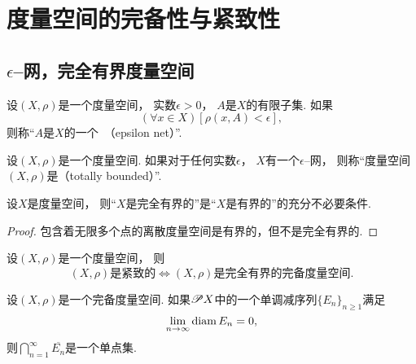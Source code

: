 \section{度量空间的完备性与紧致性}
\subsection{\texorpdfstring{$\epsilon$--网}{\textepsilon 网}，完全有界度量空间}
\begin{definition}
设\((X,\rho)\)是一个度量空间，
实数\(\epsilon>0\)，
\(A\)是\(X\)的有限子集.
如果\begin{equation*}
	(\forall x \in X)
	[\rho(x,A) < \epsilon],
\end{equation*}
则称“\(A\)是\(X\)的一个~（epsilon net）”.
\end{definition}

\begin{definition}
设\((X,\rho)\)是一个度量空间.
如果对于任何实数\(\epsilon\)，
\(X\)有一个\(\epsilon\)--网，
则称“度量空间\((X,\rho)\)是（totally bounded）”.
\end{definition}

\begin{proposition}
设\(X\)是度量空间，
则“\(X\)是完全有界的”是“\(X\)是有界的”的充分不必要条件.
\begin{proof}
包含着无限多个点的离散度量空间是有界的，但不是完全有界的.
\end{proof}
\end{proposition}

\begin{theorem}
设\((X,\rho)\)是一个度量空间，
则\begin{equation*}
	\text{$(X,\rho)$是紧致的}
	\iff
	\text{$(X,\rho)$是完全有界的完备度量空间}.
\end{equation*}
\end{theorem}

\begin{theorem}
设\((X,\rho)\)是一个完备度量空间.
如果\(\mathscr{P} X\)中的一个单调减序列\(\{E_n\}_{n\geq1}\)满足\begin{equation*}
	\lim_{n\to\infty} \operatorname{diam} E_n = 0,
\end{equation*}
则\(\bigcap_{n=1}^\infty \overline{E_n}\)是一个单点集.
\end{theorem}

